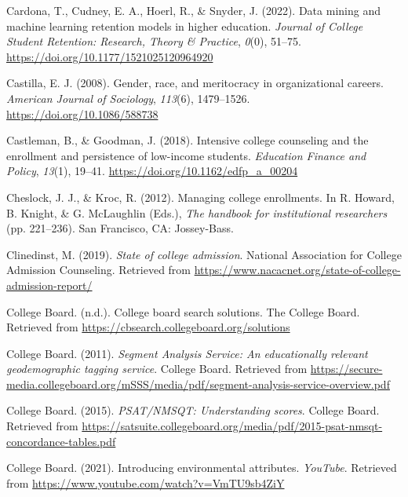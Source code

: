 \documentclass[
  12pt,
]{article}
\newlength{\cslhangindent}
\newlength{\cslentryspacingunit} %
\newenvironment{CSLReferences}[2] %
 {%
  \setlength{\parindent}{0pt}
  \ifodd #1
  \let\oldpar\par
  \def\par{\hangindent=\cslhangindent\oldpar}
  \fi
  \setlength{\parskip}{#2\cslentryspacingunit}
 }%
 {}
\begin{document}
\begin{CSLReferences}{1}{0}
\leavevmode{}%
Cardona, T., Cudney, E. A., Hoerl, R., \& Snyder, J. (2022). Data mining and machine learning retention models in higher education. \emph{Journal of College Student Retention: Research, Theory \& Practice}, \emph{0}(0), 51--75. \url{https://doi.org/10.1177/1521025120964920}

\leavevmode{}%
Castilla, E. J. (2008). Gender, race, and meritocracy in organizational careers. \emph{American Journal of Sociology}, \emph{113}(6), 1479--1526. \url{https://doi.org/10.1086/588738}

\leavevmode{}%
Castleman, B., \& Goodman, J. (2018). Intensive college counseling and the enrollment and persistence of low-income students. \emph{Education Finance and Policy}, \emph{13}(1), 19--41. \url{https://doi.org/10.1162/edfp_a_00204}

\leavevmode{}%
Cheslock, J. J., \& Kroc, R. (2012). Managing college enrollments. In R. Howard, B. Knight, \& G. McLaughlin (Eds.), \emph{The handbook for institutional researchers} (pp. 221--236). San Francisco, CA: Jossey-Bass.

\leavevmode{}%
Clinedinst, M. (2019). \emph{State of college admission}. {National Association for College Admission Counseling}. Retrieved from \url{https://www.nacacnet.org/state-of-college-admission-report/}

\leavevmode{}%
College Board. (n.d.). College board search solutions. The College Board. Retrieved from \url{https://cbsearch.collegeboard.org/solutions}

\leavevmode{}%
College Board. (2011). \emph{Segment {Analysis} {Service}: {An} educationally relevant geodemographic tagging service}. {College Board}. Retrieved from \url{https://secure-media.collegeboard.org/mSSS/media/pdf/segment-analysis-service-overview.pdf}

\leavevmode{}%
College Board. (2015). \emph{PSAT/NMSQT: Understanding scores}. {College Board}. Retrieved from \url{https://satsuite.collegeboard.org/media/pdf/2015-psat-nmsqt-concordance-tables.pdf}

\leavevmode{}%
College Board. (2021). Introducing environmental attributes. \emph{YouTube}. Retrieved from \url{https://www.youtube.com/watch?v=VmTU9sb4ZiY}


\end{CSLReferences}
\end{document}
